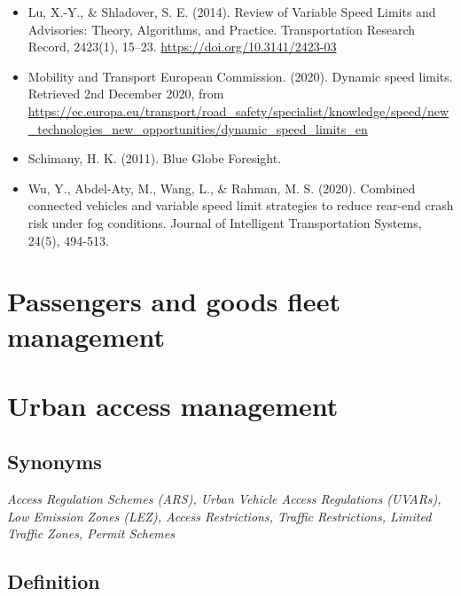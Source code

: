 \documentclass[
]{book}
\begin{document}
\begin{itemize}
\item
  Lu, X.-Y., \& Shladover, S. E. (2014). Review of Variable Speed Limits and Advisories: Theory, Algorithms, and Practice. Transportation Research Record, 2423(1), 15--23. \url{https://doi.org/10.3141/2423-03}
\item
  Mobility and Transport \textbar{} European Commission. (2020). Dynamic speed limits. Retrieved 2nd December 2020, from \url{https://ec.europa.eu/transport/road_safety/specialist/knowledge/speed/new_technologies_new_opportunities/dynamic_speed_limits_en}
\item
  Schimany, H. K. (2011). Blue Globe Foresight.
\item
  Wu, Y., Abdel-Aty, M., Wang, L., \& Rahman, M. S. (2020). Combined connected vehicles and variable speed limit strategies to reduce rear-end crash risk under fog conditions. Journal of Intelligent Transportation Systems, 24(5), 494-513.
\end{itemize}

\hypertarget{passengers-and-goods-fleet-management}{%
\section{Passengers and goods fleet management}\label{passengers-and-goods-fleet-management}}

\hypertarget{urban-access-management}{%
\section{Urban access management}\label{urban-access-management}}

\hypertarget{synonyms-5}{%
\subsection*{Synonyms}\label{synonyms-5}}

\emph{Access Regulation Schemes (ARS), Urban Vehicle Access Regulations (UVARs), Low Emission Zones (LEZ), Access Restrictions, Traffic Restrictions, Limited Traffic Zones, Permit Schemes}

\hypertarget{definition-5}{%
\subsection*{Definition}\label{definition-5}}
\end{document}
